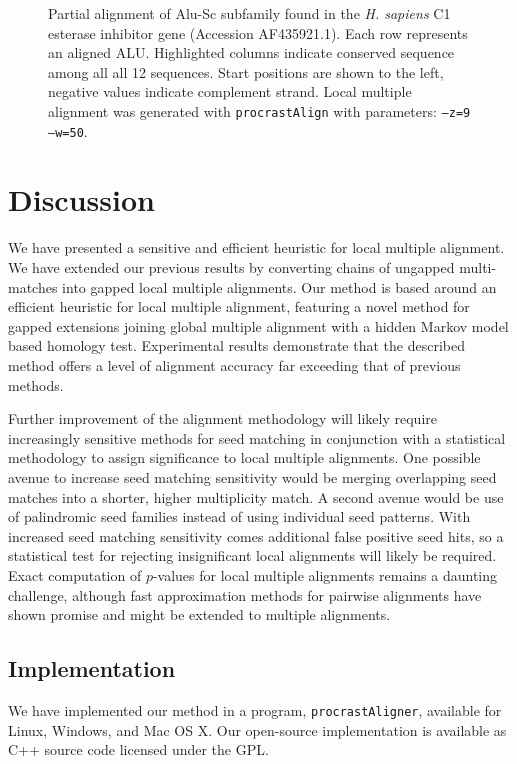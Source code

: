 \documentclass{ws-procs975x65}
\begin{document}
\begin{figure}[t]
\centering {}
\caption{Partial alignment of Alu-Sc subfamily found in the \emph{H. sapiens} C1 esterase inhibitor gene (Accession AF435921.1). Each row represents an aligned ALU. Highlighted columns indicate conserved sequence among all all 12 sequences. Start positions are shown to the left, negative values indicate complement strand.  Local multiple alignment was generated with \texttt{procrastAlign} with parameters: \texttt{--z=9 --w=50}.  }
\label{fig-align}
\end{figure}

\section{Discussion}


We have presented a sensitive and efficient heuristic for local multiple alignment. We have extended our previous results by converting chains of ungapped multi-matches into gapped local multiple alignments. Our method is based around an efficient heuristic for local multiple alignment, featuring a novel method for gapped extensions joining global multiple alignment with a hidden Markov model based homology test.  Experimental results demonstrate that the described method offers a level of alignment accuracy far exceeding that of previous methods.  

Further improvement of the alignment methodology will likely require increasingly sensitive methods for seed matching in conjunction with a statistical methodology to assign significance to local multiple alignments.  One possible avenue to increase seed matching sensitivity would be merging overlapping seed matches into a shorter, higher multiplicity match.  A second avenue would be use of palindromic seed families instead of using individual seed patterns.  
With increased seed matching sensitivity comes additional false positive seed hits, so a statistical test for rejecting insignificant local alignments will likely be required.  Exact computation of $p$-values for local multiple alignments remains a daunting challenge, although fast approximation methods for pairwise alignments have shown promise\cite{repseek} and might be extended to multiple alignments.

\subsection{Implementation}
We have implemented our method in a program, \texttt{procrastAligner}, available for Linux, Windows, and Mac OS X. Our open-source implementation is available as C++ source code licensed under the GPL.
\end{document}
